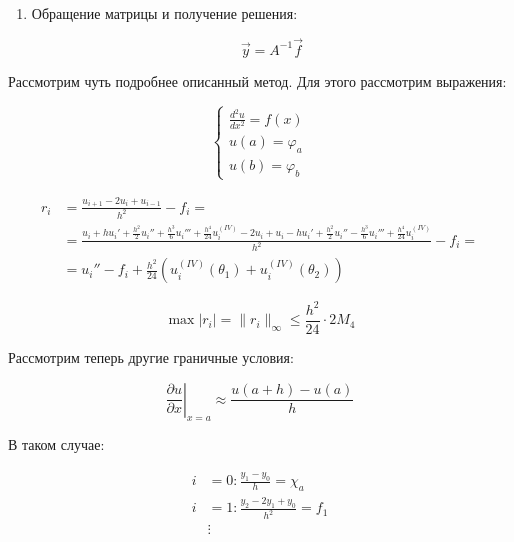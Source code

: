 \documentclass[10pt,a4paper]{article}
\begin{document}
\begin{enumerate}
		\item Обращение матрицы и получение решения:
		
		\begin{equation}
			\vec{y} = A^{-1}\vec{f}
		\end{equation}
	\end{enumerate}
	
	Рассмотрим чуть подробнее описанный метод. Для этого рассмотрим выражения:
	
	\begin{equation}
		\begin{cases}
			\frac{d^{2}u}{dx^{2}} = f\left(x\right)
			\\
			u\left(a\right) = \varphi_{a}
			\\
			u\left(b\right) = \varphi_{b}
		\end{cases}
	\end{equation}
	
	\begin{align}
		r_{i} &= \frac{u_{i + 1} - 2u_{i} + u_{i - 1}}{h^{2}} - f_{i} = \\
		&= \frac{u_{i} + hu_{i}' + \frac{h^{2}}{2}u_{i}'' + \frac{h^{3}}{6}
		u_{i}''' + \frac{h^{4}}{24}u_{i}^{\left(IV\right)} - 2u_{i} + u_{i}- 
		hu_{i}' + \frac{h^{2}}{2}u_{i}'' - \frac{h^{3}}{6}u_{i}''' + 
		\frac{h^{4}}{24}u_{i}^{\left(IV\right)}}{h^{2}} - f_{i} =\\
		&= u_{i}'' - f_{i} + \frac{h^{2}}{24}\left(u_{i}^{\left(IV\right)}
		\left(\theta_{1}\right) + u_{i}^{\left(IV\right)}\left(\theta_{2}\right)
		\right)
	\end{align}
	
	\begin{equation}
		\max \left|r_{i}\right| = \parallel r_{i}\parallel_{\infty} \leqslant
		\frac{h^{2}}{24}\cdot 2M_{4}
	\end{equation}
	
	Рассмотрим теперь другие граничные условия:
	
	\begin{equation}
		\left.\frac{\partial u}{\partial x}\right|_{x = a} \approx \frac{u
		\left(a + h\right) - u\left(a\right)}{h}
	\end{equation}
	
	В таком случае:
	
	\begin{align}
		i &= 0: \frac{y_{1} - y_{0}}{h} = \chi_{a}
		\\
		i &= 1: \frac{y_{2} - 2y_{1} + y_{0}}{h^{2}} = f_{1}
		\\
		&\vdots		
	\end{align}
	
\end{document}
